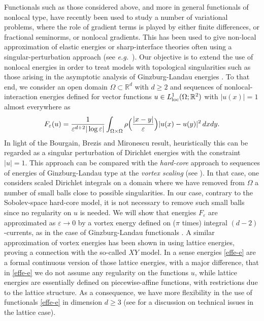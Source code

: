 \documentclass[11pt]{article}
\def\e{\varepsilon}
\def\dxy{\,dx dy}
\begin{document}
Functionals such as those considered above, and more in general functionals of nonlocal type, have recently been used to study a number of variational problems, where the role of gradient terms is played by either finite differences, or fractional seminorms, or nonlocal gradients. This has been used to give non-local approximation of elastic energies or sharp-interface theories often using a singular-perturbation approach (see {\em e.g.}~\cite{ABCP,BMP,CS,DPV,MD}). Our objective is to extend the use of nonlocal energies in order to treat models with topological singularities such as those arising in the asymptotic analysis of Ginzburg-Landau energies \cite{BBH,SS}.  To that end, we consider an open domain $\Omega\subset\mathbb R^d$ with $d\geq 2$ and sequences of nonlocal-interaction energies defined for vector functions $u\in L^1_{\rm loc} (\Omega; \mathbb R^2)$ with $|u(x)|=1$ almost everywhere as
\begin{equation}\label{effe-e} F_\e(u)=
{1\over\e^{d+2}|\log\e|} \int_{\Omega\times\Omega}\rho\Bigl({|x-y|\over\e}\Bigr) {|u(x)-u(y)|^2}\dxy. 
\end{equation} 
In light of the Bourgain, Brezis and Mironescu result, heuristically this can be regarded as a singular perturbation of Dirichlet energies with the constraint $|u|=1$. 
This approach can be compared with the {\em hard-core} approach to sequences of energies of Ginzburg-Landau type at the {\em vortex scaling} (see \cite{BBH,AP}). 
In that case, one considers scaled Dirichlet integrals on a domain where we have removed from $\Omega$ a number of small balls close to possible singularities. 
In our case, contrary to the Sobolev-space hard-core model, it is not necessary to remove such small balls  since no regularity on $u$ is needed.
We will show that energies $F_\e$ are approximated as $\e\to0$ by a vortex energy defined on ($\pi$ times) integral $(d-2)$-currents, as in the case of Ginzburg-Landau functionals \cite{BBH,J,JS,SS}. 
A similar approximation of vortex energies has been shown in \cite{AC} using lattice energies, proving a connection with the so-called $XY$ model. In a sense energies \eqref{effe-e} are a formal continuous version of those lattice energies, with a major difference, that in \eqref{effe-e} we do not assume any regularity on the functions $u$, while lattice energies are essentially defined on piecewise-affine functions, with restrictions due to the lattice structure. As a consequence, we have more flexibility in the use of functionals \eqref{effe-e} in dimension $d\ge 3$ (see \cite[Section 4.3.2]{AC} for a discussion on technical issues in the lattice case).
\end{document}

